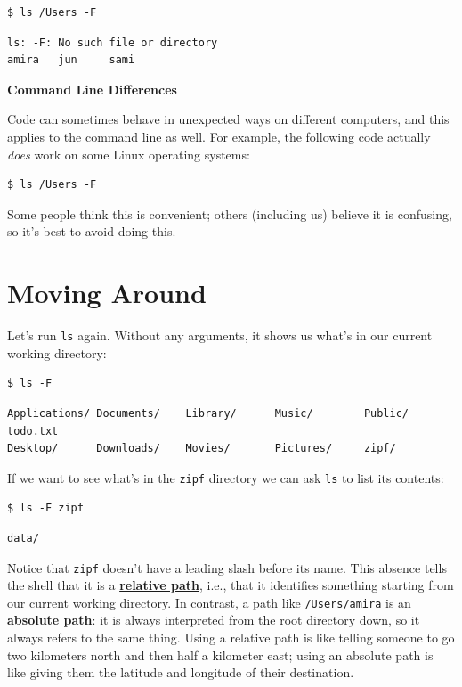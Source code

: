 \documentclass[
]{krantz}
\renewenvironment{quote}{\begin{VF}}{\end{VF}}
\newcommand{\gref}[2]{\hyperlink{#2}{\textbf{#1}}}
\begin{document}
\begin{verbatim}
$ ls /Users -F
\end{verbatim}

\begin{verbatim}
ls: -F: No such file or directory
amira   jun     sami
\end{verbatim}

\begin{quote}
\textbf{Command Line Differences}

Code can sometimes behave in unexpected ways on different computers,
and this applies to the command line as well.
For example,
the following code actually \emph{does} work on some Linux operating systems:

\begin{verbatim}
$ ls /Users -F
\end{verbatim}

Some people think this is convenient;
others (including us) believe it is confusing,
so it's best to avoid doing this.
\end{quote}

\hypertarget{bash-basics-navigate}{%
\section{Moving Around}\label{bash-basics-navigate}}

Let's run \texttt{ls} again.
Without any arguments,
it shows us what's in our current working directory:

\begin{verbatim}
$ ls -F
\end{verbatim}

\begin{verbatim}
Applications/ Documents/    Library/      Music/        Public/        todo.txt
Desktop/      Downloads/    Movies/       Pictures/     zipf/
\end{verbatim}

If we want to see what's in the \texttt{zipf} directory
we can ask \texttt{ls} to list its contents:

\begin{verbatim}
$ ls -F zipf
\end{verbatim}

\begin{verbatim}
data/
\end{verbatim}

Notice that \texttt{zipf} doesn't have a leading slash before its name.
This absence tells the shell that it is a \gref{relative path}{relative\_path},
i.e.,
that it identifies something starting from our current working directory.
In contrast,
a path like \texttt{/Users/amira} is an \gref{absolute path}{absolute\_path}:
it is always interpreted from the root directory down,
so it always refers to the same thing.
Using a relative path is like telling someone to go two kilometers north and then half a kilometer east;
using an absolute path is like giving them the latitude and longitude of their destination.
\end{document}
